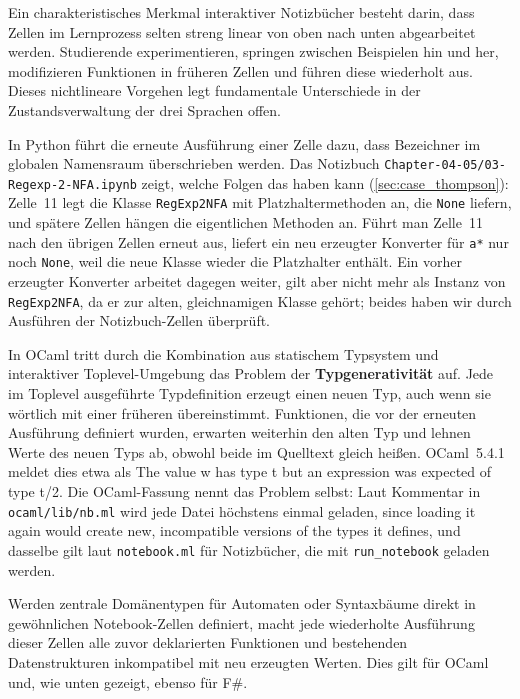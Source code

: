 Ein charakteristisches Merkmal interaktiver Notizbücher besteht darin, dass Zellen im Lernprozess selten streng linear von oben nach unten abgearbeitet werden.
Studierende experimentieren, springen zwischen Beispielen hin und her, modifizieren Funktionen in früheren Zellen und führen diese wiederholt aus.
Dieses nichtlineare Vorgehen legt fundamentale Unterschiede in der Zustandsverwaltung der drei Sprachen offen.

In Python führt die erneute Ausführung einer Zelle dazu, dass Bezeichner im globalen Namensraum überschrieben werden.
Das Notizbuch \texttt{Chapter-04-05/03-Regexp-2-NFA.ipynb} zeigt, welche Folgen das haben kann (\cref{sec:case_thompson}): Zelle~11 legt die Klasse \texttt{RegExp2NFA} mit Platzhaltermethoden an, die \texttt{None} liefern, und spätere Zellen hängen die eigentlichen Methoden an.
Führt man Zelle~11 nach den übrigen Zellen erneut aus, liefert ein neu erzeugter Konverter für \texttt{a*} nur noch \texttt{None}, weil die neue Klasse wieder die Platzhalter enthält.
Ein vorher erzeugter Konverter arbeitet dagegen weiter, gilt aber nicht mehr als Instanz von \texttt{RegExp2NFA}, da er zur alten, gleichnamigen Klasse gehört; beides haben wir durch Ausführen der Notizbuch-Zellen überprüft.

In OCaml tritt durch die Kombination aus statischem Typsystem und interaktiver Toplevel-Umgebung das Problem der \textbf{Typgenerativität} auf.
Jede im Toplevel ausgeführte Typdefinition erzeugt einen neuen Typ, auch wenn sie wörtlich mit einer früheren übereinstimmt.
Funktionen, die vor der erneuten Ausführung definiert wurden, erwarten weiterhin den alten Typ und lehnen Werte des neuen Typs ab, obwohl beide im Quelltext gleich heißen.
OCaml~5.4.1 meldet dies etwa als \glqq The value w has type t but an expression was expected of type t/2\grqq.
Die OCaml-Fassung nennt das Problem selbst: Laut Kommentar in \texttt{ocaml/lib/nb.ml} wird jede Datei höchstens einmal geladen, \glqq since loading it again would create new, incompatible versions of the types it defines\grqq, und dasselbe gilt laut \texttt{notebook.ml} für Notizbücher, die mit \texttt{run\_notebook} geladen werden.

\begin{observation}
Werden zentrale Domänentypen für Automaten oder Syntaxbäume direkt in gewöhnlichen Notebook-Zellen definiert, macht jede wiederholte Ausführung dieser Zellen alle zuvor deklarierten Funktionen und bestehenden Datenstrukturen inkompatibel mit neu erzeugten Werten.
Dies gilt für OCaml und, wie unten gezeigt, ebenso für F\#.
\end{observation}


